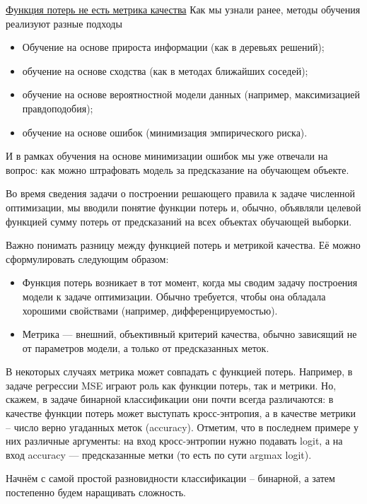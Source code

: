 \underline{Функция потерь не есть метрика качества}
Как мы узнали ранее, методы обучения реализуют разные подходы

\begin{itemize}
    \item Обучение на основе прироста информации (как в деревьях решений);
    \item обучение на основе сходства (как в методах ближайших соседей);
    \item обучение на основе вероятностной модели данных (например, максимизацией правдоподобия);
    \item обучение на основе ошибок (минимизация эмпирического риска).
\end{itemize}

И в рамках обучения на основе минимизации ошибок мы уже отвечали на вопрос: как можно штрафовать модель за
предсказание на обучающем объекте.

Во время сведения задачи о построении решающего правила к задаче численной оптимизации, мы вводили понятие функции
потерь и, обычно, объявляли целевой функцией сумму потерь от предсказаний на всех объектах обучающей выборки.

Важно понимать разницу между функцией потерь и метрикой качества.
Её можно сформулировать следующим образом:

\begin{itemize}
    \item Функция потерь возникает в тот момент, когда мы сводим задачу построения модели к задаче оптимизации.
    Обычно требуется, чтобы она обладала хорошими свойствами (например, дифференцируемостью).
    \item Метрика — внешний, объективный критерий качества, обычно зависящий не от параметров модели, а только от
    предсказанных меток.
\end{itemize}

В некоторых случаях метрика может совпадать с функцией потерь.
Например, в задаче регрессии MSE играют роль как функции потерь, так и метрики.
Но, скажем, в задаче бинарной классификации они почти всегда различаются: в качестве функции потерь может выступать
кросс-энтропия, а в качестве метрики -- число верно угаданных меток (accuracy).
Отметим, что в последнем примере у них различные аргументы: на вход кросс-энтропии нужно подавать logit, а на вход
accuracy — предсказанные метки (то есть по сути argmax logit).

Начнём с самой простой разновидности классификации -- бинарной, а затем постепенно будем наращивать сложность.

